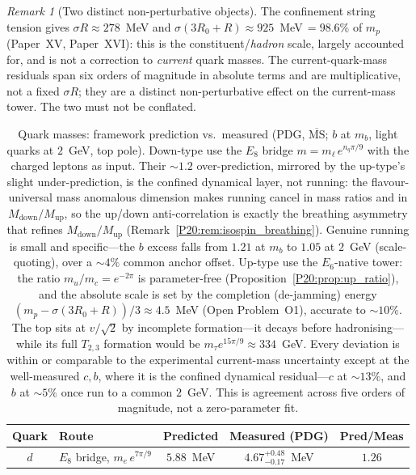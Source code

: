 \documentclass[11pt,a4paper]{article}
\theoremstyle{definition}\newtheorem{definition}[theorem]{Definition}
\theoremstyle{remark}
\newtheorem{remark}[theorem]{Remark}
\newcommand{\Mup}{M_{\mathrm{up}}}
\newcommand{\Mdn}{M_{\mathrm{down}}}
\begin{document}
\begin{remark}[Two distinct non-perturbative objects]
\label{P20:rem:two_objects}
The confinement string tension gives $\sigma R\approx278$~MeV and
$\sigma(3R_0+R)\approx925$~MeV$\,=98.6\%$ of $m_p$ (Paper~XV,
Paper~XVI): this is the constituent/\emph{hadron} scale, largely
accounted for, and is not a correction to \emph{current} quark masses.
The current-quark-mass residuals span six orders of magnitude in
absolute terms and are multiplicative, not a fixed $\sigma R$; they are
a distinct non-perturbative effect on the current-mass tower. The two
must not be conflated.
\end{remark}

\begin{table}[htbp]
\centering
\caption{Quark masses: framework prediction vs.\ measured (PDG,
$\overline{\mathrm{MS}}$; $b$ at $m_b$, light quarks at $2$~GeV, top pole).
Down-type use the $E_8$ bridge $m=m_\ell\,e^{n_q\pi/9}$ with the charged
leptons as input. Their $\sim\!1.2$ over-prediction, mirrored by the
up-type's slight under-prediction, is the confined dynamical layer, not
running: the flavour-universal mass anomalous dimension makes running
cancel in mass ratios and in $\Mdn/\Mup$, so the up/down anti-correlation
is exactly the breathing asymmetry that refines $\Mdn/\Mup$
(Remark~\ref{P20:rem:isospin_breathing}). Genuine running is small and
specific---the $b$ excess falls from $1.21$ at $m_b$ to $1.05$ at $2$~GeV
(scale-quoting), over a $\sim\!4\%$ common anchor offset. Up-type use the
$E_6$-native tower: the ratio $m_u/m_c=e^{-2\pi}$ is parameter-free
(Proposition~\ref{P20:prop:up_ratio}), and the absolute scale is set by the
completion (de-jamming) energy $(m_p-\sigma(3R_0+R))/3\approx4.5$~MeV
(Open Problem~O1), accurate to $\sim\!10\%$. The top sits at $v/\sqrt2$ by
incomplete formation---it decays before hadronising---while its full $T_{2,3}$
formation would be $m_\tau e^{15\pi/9}\approx334$~GeV. Every deviation is within
or comparable to the experimental current-mass uncertainty except at the
well-measured $c,b$, where it is the confined dynamical residual---$c$ at
$\sim\!13\%$, and $b$ at $\sim\!5\%$ once run to a common $2$~GeV.
This is agreement across five orders of magnitude, not a zero-parameter fit.}
\label{P20:tab:predvsmeas}
\begin{tabular}{clccc}
\hline
Quark & Route & Predicted & Measured (PDG) & Pred/Meas \\
\hline
$d$ & $E_8$ bridge, $m_e\,e^{7\pi/9}$   & $5.88$~MeV  & $4.67^{+0.48}_{-0.17}$~MeV & $1.26$ \\

\end{tabular}
\end{table}
\end{document}
